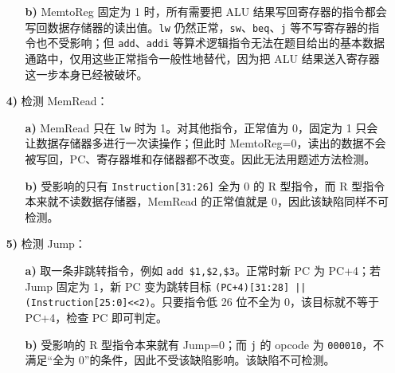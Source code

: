 \begin{problem}
\begin{solution}
\begin{enumerate}
\begin{enumerate}
                \item[\textbf{b)}] MemtoReg 固定为 1 时，所有需要把 ALU 结果写回寄存器的指令都会写回数据存储器的读出值。\texttt{lw} 仍然正常，\texttt{sw}、\texttt{beq}、\texttt{j} 等不写寄存器的指令也不受影响；但 \texttt{add}、\texttt{addi} 等算术逻辑指令无法在题目给出的基本数据通路中，仅用这些正常指令一般性地替代，因为把 ALU 结果送入寄存器这一步本身已经被破坏。
            \end{enumerate}

            \item[\textbf{4)}] 检测 MemRead：
            \begin{enumerate}
                \item[\textbf{a)}] MemRead 只在 \texttt{lw} 时为 1。对其他指令，正常值为 0，固定为 1 只会让数据存储器多进行一次读操作；但此时 MemtoReg=0，读出的数据不会被写回，PC、寄存器堆和存储器都不改变。因此无法用题述方法检测。
                \item[\textbf{b)}] 受影响的只有 \texttt{Instruction[31:26]} 全为 0 的 R 型指令，而 R 型指令本来就不读数据存储器，MemRead 的正常值就是 0，因此该缺陷同样不可检测。
            \end{enumerate}

            \item[\textbf{5)}] 检测 Jump：
            \begin{enumerate}
                \item[\textbf{a)}] 取一条非跳转指令，例如 \texttt{add \$1,\$2,\$3}。正常时新 PC 为 PC+4；若 Jump 固定为 1，新 PC 变为跳转目标 \texttt{(PC+4)[31:28] || (Instruction[25:0]<<2)}。只要指令低 26 位不全为 0，该目标就不等于 PC+4，检查 PC 即可判定。
                \item[\textbf{b)}] 受影响的 R 型指令本来就有 Jump=0；而 \texttt{j} 的 opcode 为 \texttt{000010}，不满足“全为 0”的条件，因此不受该缺陷影响。该缺陷不可检测。
            \end{enumerate}


\end{enumerate}
\end{solution}
\end{problem}
